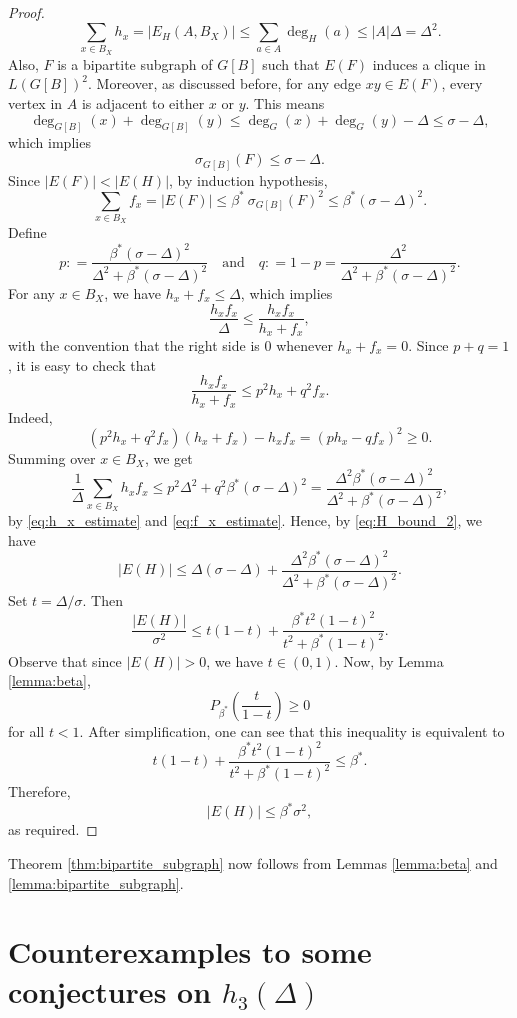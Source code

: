 \documentclass[11pt]{article}
\theoremstyle{plain}
\numberwithin{equation}{section}
\begin{document}
\begin{proof}
\begin{equation}\label{eq:h_x_estimate}
  \sum_{x\in B_X} h_x  = |E_H(A, B_X)| \le \sum_{a\in A} \deg_H(a)\le |A|\Delta = \Delta^2.  
\end{equation}
Also, $F$ is a bipartite subgraph of $G[B]$ such that $E(F)$ induces a clique in $L(G[B])^2$. Moreover, as discussed before, for any edge $xy\in E(F)$, every vertex in $A$ is adjacent to either $x$ or $y$. This means
\[ \deg_{G[B]}(x) + \deg_{G[B]}(y) \le \deg_G(x) + \deg_{G}(y) - \Delta \le \sigma - \Delta,\]
which implies 
\[ \sigma_{G[B]}(F) \le \sigma - \Delta.\]
Since $|E(F)| < |E(H)|$, by induction hypothesis,
\begin{equation}\label{eq:f_x_estimate}
   \sum_{x\in B_X}f_x = |E(F)|\le \beta^*\ \sigma_{G[B]}(F)^2 \le \beta^* (\sigma - \Delta)^2. 
\end{equation}
Define 
\[ p: = \frac{\beta^*(\sigma-\Delta)^2}{\Delta^2 + \beta^*(\sigma-\Delta)^2} \quad \text{and} \quad q: = 1-p = \frac{\Delta^2}{\Delta^2 +\beta^*(\sigma-\Delta)^2}.\]
For any $x\in B_X$, we have $h_x + f_x \le \Delta$, which implies 
\[
   \frac{h_xf_x}{\Delta}
   \le
   \frac{h_xf_x}{h_x+f_x},
\]
with the convention that the right side is $0$ whenever $h_x + f_x = 0$. Since $p + q = 1$, it is easy to check that 
\[    \frac{h_xf_x}{h_x+f_x} \le p^2 h_x + q^2 f_x.\]
Indeed, 
\[ (p^2 h_x + q^2 f_x)(h_x + f_x) - h_xf_x = (ph_x - qf_x)^2 \ge 0.\]
Summing over $x\in B_X$, we get
\[ \frac{1}{\Delta}\sum_{x\in B_X}h_xf_x \le  p^2 \Delta^2 + q^2 \beta^* (\sigma - \Delta)^2 = \frac{\Delta^2\beta^*(\sigma-\Delta)^2}{\Delta^2 + \beta^*(\sigma-\Delta)^2},\]
by \eqref{eq:h_x_estimate} and \eqref{eq:f_x_estimate}. Hence, by \eqref{eq:H_bound_2}, we have
\[
   |E(H)| \le \Delta(\sigma-\Delta) + \frac{\Delta^2\beta^*(\sigma-\Delta)^2}{\Delta^2 + \beta^*(\sigma-\Delta)^2}.
\]
Set $t=\Delta/\sigma$. Then
\[
   \frac{|E(H)|}{\sigma^2}
   \le
   t(1-t)+
   \frac{\beta^* t^2(1-t)^2}{t^2+\beta^*(1-t)^2}.
\]
Observe that since $|E(H)|>0$, we have $t\in (0,1)$. Now, by Lemma \ref{lemma:beta}, 
\[P_{\beta^*}\left(\frac{t}{1-t}\right)\ge 0\] for all $t<1$. After simplification, one can see that this inequality is equivalent to 
\[t(1-t)+
   \frac{\beta^* t^2(1-t)^2}{t^2+\beta^*(1-t)^2}\le \beta^*. 
\]
Therefore,
\[
   |E(H)|\le \beta^*\sigma^2,
\]
as required.
\end{proof}

Theorem \ref{thm:bipartite_subgraph} now follows from Lemmas \ref{lemma:beta} and \ref{lemma:bipartite_subgraph}.  

\section{Counterexamples to some conjectures on $h_3(\Delta)$}
\label{section:counterexample_power_3}
\end{document}

